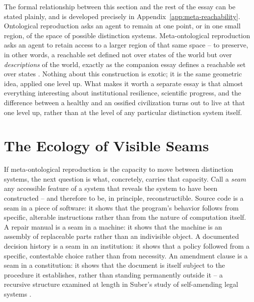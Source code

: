 \documentclass[11pt]{article}
\theoremstyle{plain}
\begin{document}
The formal relationship between this section and the rest of the essay can be stated plainly, and is developed precisely in Appendix~\ref{app:meta-reachability}. Ontological reproduction asks an agent to remain at one point, or in one small region, of the space of possible distinction systems. Meta-ontological reproduction asks an agent to retain access to a larger region of that same space -- to preserve, in other words, a reachable set defined not over states of the world but over \emph{descriptions} of the world, exactly as the companion essay defines a reachable set over states \cite{flyxion2026cone}. Nothing about this construction is exotic; it is the same geometric idea, applied one level up. What makes it worth a separate essay is that almost everything interesting about institutional resilience, scientific progress, and the difference between a healthy and an ossified civilization turns out to live at that one level up, rather than at the level of any particular distinction system itself.

\section{The Ecology of Visible Seams}
\label{sec:visible-seams}

If meta-ontological reproduction is the capacity to move between distinction systems, the next question is what, concretely, carries that capacity. Call a \emph{seam} any accessible feature of a system that reveals the system to have been constructed -- and therefore to be, in principle, reconstructible. Source code is a seam in a piece of software: it shows that the program's behavior follows from specific, alterable instructions rather than from the nature of computation itself. A repair manual is a seam in a machine: it shows that the machine is an assembly of replaceable parts rather than an indivisible object. A documented decision history is a seam in an institution: it shows that a policy followed from a specific, contestable choice rather than from necessity. An amendment clause is a seam in a constitution: it shows that the document is itself subject to the procedure it establishes, rather than standing permanently outside it -- a recursive structure examined at length in Suber's study of self-amending legal systems \cite{suber1990}.
\end{document}
